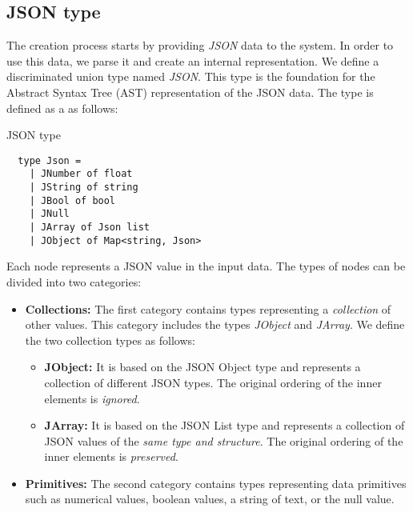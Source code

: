 \subsection{JSON type}
\label{sub:json}
The creation process starts by providing \emph{JSON} data to the system.
In order to use this data, we parse it and create an internal representation.
We define a discriminated union type named \emph{JSON}.
This type is the foundation for the Abstract Syntax Tree (AST) representation of the JSON data.
The type is defined as a as follows:
\begin{listing}[H]
	\caption {JSON type}
	\begin{lstlisting}
  type Json =
    | JNumber of float
    | JString of string
    | JBool of bool
    | JNull
    | JArray of Json list
    | JObject of Map<string, Json>
  \end{lstlisting}
\end{listing}

Each node represents a JSON value in the input data.
The types of nodes can be divided into two categories:
\begin{itemize}
	\item {\textbf{Collections:} The first category contains types representing a \emph{collection} of other values. This category includes the types \emph{JObject} and \emph{JArray}.
	      We define the two collection types as follows:
	      \begin{itemize}
		      \item \textbf{JObject:} It is based on the JSON Object type and represents a collection of different JSON types. The original ordering of the inner elements is \emph{ignored}.
		      \item \textbf{JArray:} It is based on the JSON List type and represents a collection of JSON values of the \emph{same type and structure}. The original ordering of the inner elements is \emph{preserved}.
	      \end{itemize}
	      }
	\item \textbf{Primitives:} The second category contains types representing data primitives such as numerical values, boolean values,
	      a string of text, or the null value.
\end{itemize}

